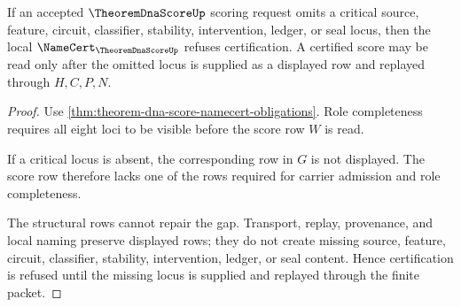 \begin{theorem}
\label{thm:theorem-dna-score-critical-locus-refusal}
If an accepted $\TheoremDnaScoreUp$ scoring request omits a critical source, feature, circuit, classifier, stability, intervention, ledger, or seal locus, then the local $\NameCert_{\TheoremDnaScoreUp}$ refuses certification. A certified score may be read only after the omitted locus is supplied as a displayed row and replayed through $H,C,P,N$.
\end{theorem}
\begin{proof}
Use \autoref{thm:theorem-dna-score-namecert-obligations}. Role completeness requires all eight loci to be visible before the score row $W$ is read.

If a critical locus is absent, the corresponding row in $G$ is not displayed. The score row therefore lacks one of the rows required for carrier admission and role completeness.

The structural rows cannot repair the gap. Transport, replay, provenance, and local naming preserve displayed rows; they do not create missing source, feature, circuit, classifier, stability, intervention, ledger, or seal content. Hence certification is refused until the missing locus is supplied and replayed through the finite packet.
\end{proof}




